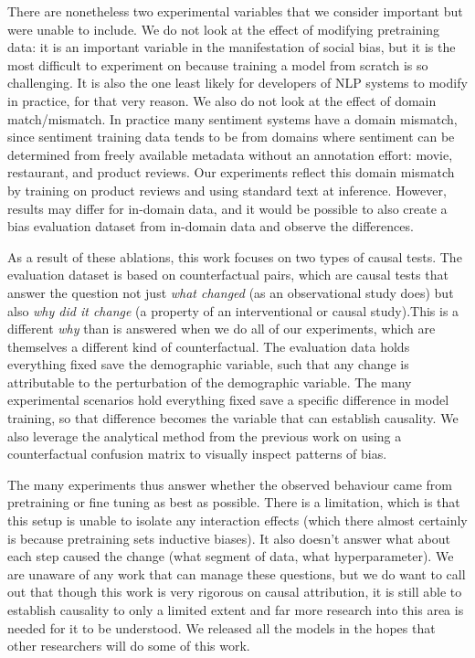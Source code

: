 There are nonetheless two experimental variables that we consider important but were unable to include. We do not look at the effect of modifying pretraining data: it is an important variable in the manifestation of social bias, but it is the most difficult to experiment on because training a model from scratch is so challenging. It is also the one least likely for developers of NLP systems to modify in practice, for that very reason. We also do not look at the effect of domain match/mismatch. In practice many sentiment systems have a domain mismatch, since sentiment training data tends to be from domains where sentiment can be determined from freely available metadata without an annotation effort: movie, restaurant, and product reviews. Our experiments reflect this domain mismatch by training on product reviews and using standard text at inference. However, results may differ for in-domain data, and it would be possible to also create a bias evaluation dataset from in-domain data and observe the differences.

As a result of these ablations, this work focuses on two types of causal tests. The evaluation dataset is based on counterfactual pairs, which are causal tests that answer the question not just \textit{what changed} (as an observational study does) but also \textit{why did it change} (a property of an interventional or causal study).This is a different \textit{why} than is answered when we do all of our experiments, which are themselves a different kind of counterfactual. The evaluation data holds everything fixed save the demographic variable, such that any change is attributable to the perturbation of the demographic variable. The many experimental scenarios hold everything fixed save a specific difference in model training, so that difference becomes the variable that can establish causality.
We also leverage the analytical method from the previous work on using a counterfactual confusion matrix to visually inspect patterns of bias. 

The many experiments thus answer whether the observed behaviour came from pretraining or fine tuning as best as possible. There is a limitation, which is that this setup is unable to isolate any interaction effects (which there almost certainly is because pretraining sets inductive biases). It also doesn't answer what about each step caused the change (what segment of data, what hyperparameter). We are unaware of any work that can manage these questions, but we do want to call out that though this work is very rigorous on causal attribution, it is still able to establish causality to only a limited extent and far more research into this area is needed for it to be understood. We released all the models in the hopes that other researchers will do some of this work. 

